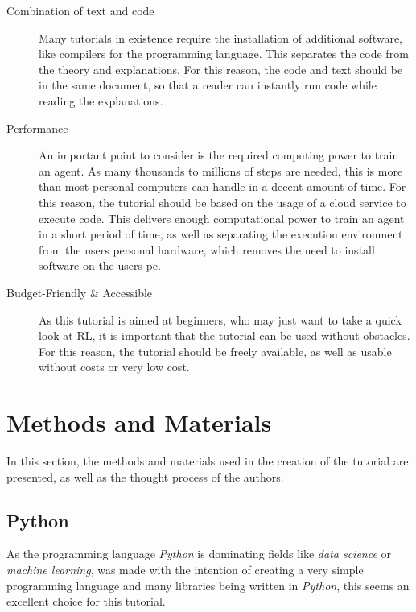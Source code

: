\documentclass[10pt,a4paper]{article}
\begin{document}
\begin{description}
			\item[Combination of text and code] Many tutorials in existence require the installation of additional software, like compilers for the programming language. This separates the code from the theory and explanations. For this reason, the code and text should be in the same document, so that a reader can instantly run code while reading the explanations. 
			
			\item[Performance] An important point to consider is the required computing power to train an agent. As many thousands to millions of steps are needed, this is more than most personal computers can handle in a decent amount of time.  
			For this reason, the tutorial should be based on the usage of a cloud service to execute code. 
			This delivers enough computational power to train an agent in a short period of time, as well as separating the execution environment from the users personal hardware, which removes the need to install software on the users pc.
			
			\item[Budget-Friendly \& Accessible] As this tutorial is aimed at beginners, who may just want to take a quick look at RL, it is important that the tutorial can be used without obstacles. For this reason, the tutorial should be freely available, as well as usable without costs or very low cost.
		\end{description}

	\section{Methods and Materials}
		In this section, the methods and materials used in the creation of the tutorial are presented, as well as the thought process of the authors.

		\subsection{Python} As the programming language \textit{Python} is dominating fields like \textit{data science} or \textit{machine learning}, was made with the intention of creating a very simple programming language and many libraries being written in \textit{Python}, this seems an excellent choice for this tutorial.\\ 
\end{document}
